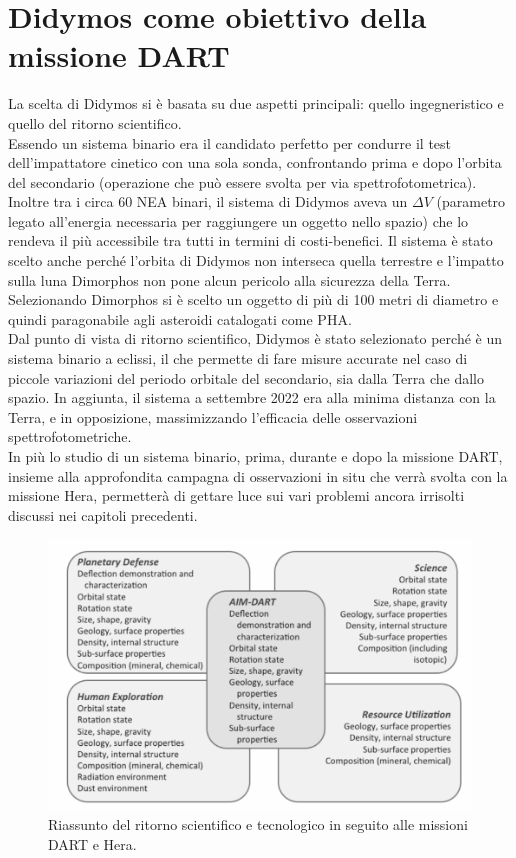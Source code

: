 \section{Didymos come obiettivo della missione DART}
La scelta di Didymos si è basata su due aspetti principali: quello ingegneristico e quello del ritorno scientifico.\\
Essendo un sistema binario era il candidato perfetto per condurre il test dell'impattatore cinetico con una sola sonda, confrontando prima e dopo l'orbita del secondario (operazione che può essere svolta per via spettrofotometrica). Inoltre tra i circa 60 NEA binari, il sistema di Didymos aveva un $\Delta V$ (parametro legato all'energia necessaria per raggiungere un oggetto nello spazio) che lo rendeva il più accessibile tra tutti in termini di costi-benefici. Il sistema è stato scelto anche perché l'orbita di Didymos non interseca quella terrestre e l'impatto sulla luna Dimorphos non pone alcun pericolo alla sicurezza della Terra. Selezionando Dimorphos si è scelto un oggetto di più di 100 metri di diametro e quindi paragonabile agli asteroidi catalogati come PHA.\\
Dal punto di vista di ritorno scientifico, Didymos è stato selezionato perché è un sistema binario a eclissi, il che permette di fare misure accurate nel caso di piccole variazioni del periodo orbitale del secondario, sia dalla Terra che dallo spazio. In aggiunta, il sistema a settembre 2022 era alla minima distanza con la Terra, e in opposizione, massimizzando l'efficacia delle osservazioni spettrofotometriche.\\
In più lo studio di un sistema binario, prima, durante e dopo la missione DART, insieme alla approfondita campagna di osservazioni in situ che verrà svolta con la missione Hera, permetterà di gettare luce sui vari problemi ancora irrisolti discussi nei capitoli precedenti.

\begin{figure}[!h]
    \centering
    \includegraphics[width=\textwidth]{figure/Michel et al.png}
    \caption[Riassunto del ritorno scientifico e tecnologico in seguito alle missioni DART e Hera.]{Riassunto del ritorno scientifico e tecnologico in seguito alle missioni DART e Hera. \citep{MICHEL20162529}}
    \label{fig:ritorno_scientifico}
\end{figure}

